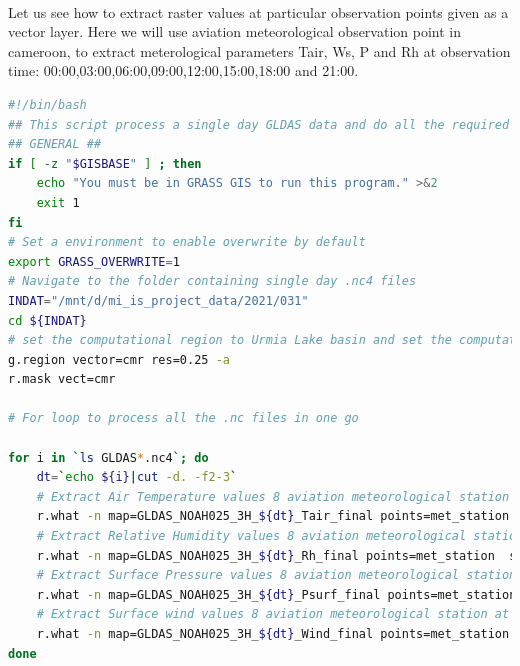 \paragraph{}
Let us see how to extract raster values at particular observation points given as a vector layer. 
Here we will use aviation meteorological observation point in cameroon, to extract meterological parameters
Tair, Ws, P and Rh at observation time: 00:00,03:00,06:00,09:00,12:00,15:00,18:00 and 21:00.
\begin{lstlisting}[language=Bash]
#!/bin/bash
## This script process a single day GLDAS data and do all the required conversions needed for PySEBAL
## GENERAL ##
if [ -z "$GISBASE" ] ; then
    echo "You must be in GRASS GIS to run this program." >&2
    exit 1
fi
# Set a environment to enable overwrite by default
export GRASS_OVERWRITE=1
# Navigate to the folder containing single day .nc4 files
INDAT="/mnt/d/mi_is_project_data/2021/031" 
cd ${INDAT}
# set the computational region to Urmia Lake basin and set the computational resolution to 0.25 degrees
g.region vector=cmr res=0.25 -a
r.mask vect=cmr

# For loop to process all the .nc files in one go

for i in `ls GLDAS*.nc4`; do
    dt=`echo ${i}|cut -d. -f2-3`
    # Extract Air Temperature values 8 aviation meteorological station at time = dt and save the value in .csv file
    r.what -n map=GLDAS_NOAH025_3H_${dt}_Tair_final points=met_station  sep=comma output=a_temp_${dt}Z.csv
    # Extract Relative Humidity values 8 aviation meteorological station at time = dt and save the value in .csv file
    r.what -n map=GLDAS_NOAH025_3H_${dt}_Rh_final points=met_station  sep=comma output=a_rh_${dt}Z.csv
    # Extract Surface Pressure values 8 aviation meteorological station at time = dt and save the value in .csv file
    r.what -n map=GLDAS_NOAH025_3H_${dt}_Psurf_final points=met_station  sep=comma output=a_p_${dt}Z.csv
    # Extract Surface wind values 8 aviation meteorological station at time = dt and save the value in .csv file
    r.what -n map=GLDAS_NOAH025_3H_${dt}_Wind_final points=met_station  sep=comma output=a_ws_${dt}Z.csv
done
\end{lstlisting}
